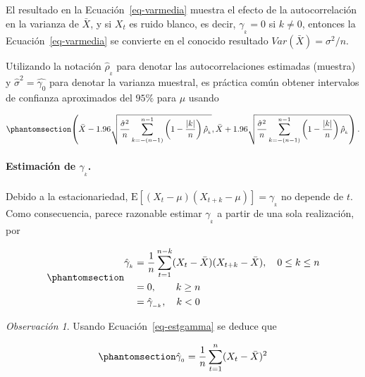 \documentclass[
  us-letterpaper,
]{scrreprt}
\let\oldparagraph\paragraph
\renewcommand{\paragraph}[1]{\oldparagraph{#1}\mbox{}}
\theoremstyle{definition}
\theoremstyle{plain}
\theoremstyle{plain}
\theoremstyle{definition}
\theoremstyle{remark}
\newtheorem*{remark}{Observación}
\begin{document}
El resultado en la Ecuación~\ref{eq-varmedia} muestra el efecto de la
autocorrelación en la varianza de \(\bar X\), y si \(X_t\) es ruido
blanco, es decir, \(\gamma_{_{k}} = 0\) si \(k \ne 0\), entonces la
Ecuación~\ref{eq-varmedia} se convierte en el conocido resultado
\(Var(\bar X) = \sigma^2/n\).

Utilizando la notación \(\hat \rho_{_k}\) para denotar las
autocorrelaciones estimadas (muestra) y \(\hat\sigma^2=\hat{\gamma_0}\)
para denotar la varianza muestral, es práctica común obtener intervalos
de confianza aproximados del \(95\%\) para \(\mu\) usando

\begin{equation}\phantomsection\label{eq-iconf}{
\left(\bar X- 1.96\sqrt{\frac{\hat\sigma^2}{n}\sum_{k=-(n-1)}^{n-1}\left(1-\frac{|k|}{n}\right)\hat\rho_{_k}}, \bar X+ 1.96\sqrt{\frac{\hat\sigma^2}{n}\sum_{k=-(n-1)}^{n-1}\left(1-\frac{|k|}{n}\right)\hat\rho_{_k}}\right).
}\end{equation}

\paragraph{\texorpdfstring{Estimación de
\(\gamma_{_k}\).}{Estimación de \textbackslash gamma\_\{\_k\}.}}\label{estimaciuxf3n-de-gamma__k.}

Debido a la estacionariedad,
\(\mathrm E[(X_t − \mu)(X_{t+k} − \mu)] = \gamma_{_k}\) no depende de
\(t.\) Como consecuencia, parece razonable estimar \(\gamma_{_k}\) a
partir de una sola realización, por

\begin{equation}\phantomsection\label{eq-estgamma}{
\begin{split}\hat{\gamma}_{_k}&= \frac{1}{n}\sum_{t=1}^{n-k}(X_t-\bar X)(X_{t+k}-\bar X), \quad 0\leq k\leq n\\
&=0,\qquad k\ge n\\
&=\hat{\gamma}_{_{-k}},\quad k<0\end{split}
}\end{equation}

\begin{remark}
Usando Ecuación~\ref{eq-estgamma} se deduce que

\begin{equation}\phantomsection\label{eq-hatgamma0}{
\hat{\gamma}_{_0}= \frac{1}{n}\sum_{t=1}^{n}(X_t-\bar X)^2
}\end{equation}
\end{remark}
\end{document}
